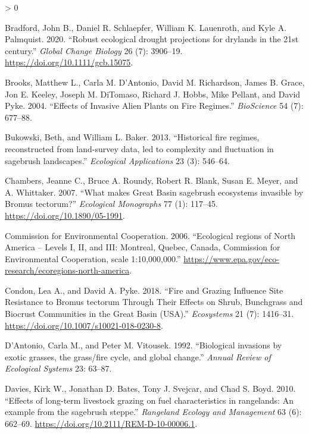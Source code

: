 \documentclass[
  12pt,
]{article}
\newlength{\cslhangindent}
\newenvironment{CSLReferences}[2] %
 {%
  \setlength{\parindent}{0pt}
  \ifodd #1 \everypar{\setlength{\hangindent}{\cslhangindent}}\ignorespaces\fi
  \ifnum #2 > 0
  \setlength{\parskip}{#2\baselineskip}
  \fi
 }%
 {}
\begin{document}
\begin{CSLReferences}{1}{0}
\leavevmode\hypertarget{ref-Bradford2020}{}%
Bradford, John B., Daniel R. Schlaepfer, William K. Lauenroth, and Kyle
A. Palmquist. 2020. {``{Robust ecological drought projections for
drylands in the 21st century}.''} \emph{Global Change Biology} 26 (7):
3906--19. \url{https://doi.org/10.1111/gcb.15075}.

\leavevmode\hypertarget{ref-Brooks2004}{}%
Brooks, Matthew L., Carla M. D'Antonio, David M. Richardson, James B.
Grace, Jon E. Keeley, Joseph M. DiTomaso, Richard J. Hobbs, Mike
Pellant, and David Pyke. 2004. {``{Effects of Invasive Alien Plants on
Fire Regimes}.''} \emph{BioScience} 54 (7): 677--88.

\leavevmode\hypertarget{ref-Bukowski2013}{}%
Bukowski, Beth, and William L. Baker. 2013. {``{Historical fire regimes,
reconstructed from land-survey data, led to complexity and fluctuation
in sagebrush landscapes}.''} \emph{Ecological Applications} 23 (3):
546--64.

\leavevmode\hypertarget{ref-Chambers2007}{}%
Chambers, Jeanne C., Bruce A. Roundy, Robert R. Blank, Susan E. Meyer,
and A. Whittaker. 2007. {``{What makes Great Basin sagebrush ecosystems
invasible by Bromus tectorum?}''} \emph{Ecological Monographs} 77 (1):
117--45. \url{https://doi.org/10.1890/05-1991}.

\leavevmode\hypertarget{ref-CEC2006}{}%
Commission for Environmental Cooperation. 2006. {``{Ecological regions
of North America -- Levels I, II, and III: Montreal, Quebec, Canada,
Commission for Environmental Cooperation, scale 1:10,000,000}.''}
\url{https://www.epa.gov/eco-research/ecoregions-north-america}.

\leavevmode\hypertarget{ref-Condon2018}{}%
Condon, Lea A., and David A. Pyke. 2018. {``{Fire and Grazing Influence
Site Resistance to Bromus tectorum Through Their Effects on Shrub,
Bunchgrass and Biocrust Communities in the Great Basin (USA)}.''}
\emph{Ecosystems} 21 (7): 1416--31.
\url{https://doi.org/10.1007/s10021-018-0230-8}.

\leavevmode\hypertarget{ref-DAntonio1992}{}%
D'Antonio, Carla M., and Peter M. Vitousek. 1992. {``{Biological
invasions by exotic grasses, the grass/fire cycle, and global
change}.''} \emph{Annual Review of Ecological Systems} 23: 63--87.

\leavevmode\hypertarget{ref-Davies2010}{}%
Davies, Kirk W., Jonathan D. Bates, Tony J. Svejcar, and Chad S. Boyd.
2010. {``{Effects of long-term livestock grazing on fuel characteristics
in rangelands: An example from the sagebrush steppe}.''} \emph{Rangeland
Ecology and Management} 63 (6): 662--69.
\url{https://doi.org/10.2111/REM-D-10-00006.1}.


\end{CSLReferences}
\end{document}
